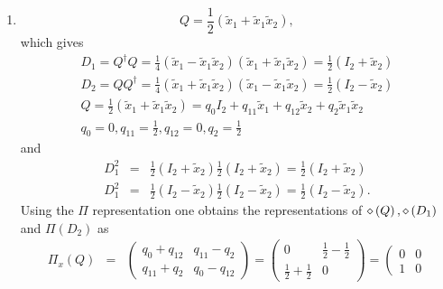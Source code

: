 \documentclass[aps,preprint]{revtex4}
\begin{document}
\begin{enumerate}
\item 
\begin{equation}
Q=\frac{1}{2}\left( \widetilde{x}_{1}+\widetilde{x}_{1}\widetilde{x}%
_{2}\right) ,
\end{equation}%
which gives 
\begin{gather}
D_{1}=Q^{\dagger }Q=\frac{1}{4}\left( \widetilde{x}_{1}-\widetilde{x}_{1}%
\widetilde{x}_{2}\right) \left( \widetilde{x}_{1}+\widetilde{x}_{1}%
\widetilde{x}_{2}\right) =\frac{1}{2}\left( I_{2}+\widetilde{x}_{2}\right) \\
D_{2}=QQ^{\dagger }=\frac{1}{4}\left( \widetilde{x}_{1}+\widetilde{x}_{1}%
\widetilde{x}_{2}\right) \left( \widetilde{x}_{1}-\widetilde{x}_{1}%
\widetilde{x}_{2}\right) =\frac{1}{2}\left( I_{2}-\widetilde{x}_{2}\right) \\
Q=\frac{1}{2}\left( \widetilde{x}_{1}+\widetilde{x}_{1}\widetilde{x}%
_{2}\right) =q_{0}I_{2}+q_{11}\widetilde{x}_{1}+q_{12}\widetilde{x}_{2}+q_{2}%
\widetilde{x}_{1}\widetilde{x}_{2} \\
q_{0}=0,q_{11}=\frac{1}{2},q_{12}=0,q_{2}=\frac{1}{2}
\end{gather}%
and 
\begin{eqnarray}
D_{1}^{2} &=&\frac{1}{2}\left( I_{2}+\widetilde{x}_{2}\right) \frac{1}{2}%
\left( I_{2}+\widetilde{x}_{2}\right) =\frac{1}{2}\left( I_{2}+\widetilde{x}%
_{2}\right) \\
D_{1}^{2} &=&\frac{1}{2}\left( I_{2}-\widetilde{x}_{2}\right) \frac{1}{2}%
\left( I_{2}-\widetilde{x}_{2}\right) =\frac{1}{2}\left( I_{2}-\widetilde{x}%
_{2}\right) .
\end{eqnarray}%
Using the $\Pi $ representation one obtains the representations of $\mathcal{%
\Pi }\left( Q\right) ,\mathcal{\Pi }\left( D_{1}\right) $ and $\mathcal{\Pi }%
\left( D_{2}\right) $ as 
\begin{eqnarray*}
\mathcal{\Pi }_{x}\left( Q\right) &=&\left( 
\begin{array}{cc}
q_{0}+q_{12} & q_{11}-q_{2} \\ 
q_{11}+q_{2} & q_{0}-q_{12}%
\end{array}%
\right) =\left( 
\begin{array}{cc}
0 & \frac{1}{2}-\frac{1}{2} \\ 
\frac{1}{2}+\frac{1}{2} & 0%
\end{array}%
\right) =\left( 
\begin{array}{cc}
0 & 0 \\ 
1 & 0%
\end{array}%

\end{eqnarray*}
\end{enumerate}
\end{document}
